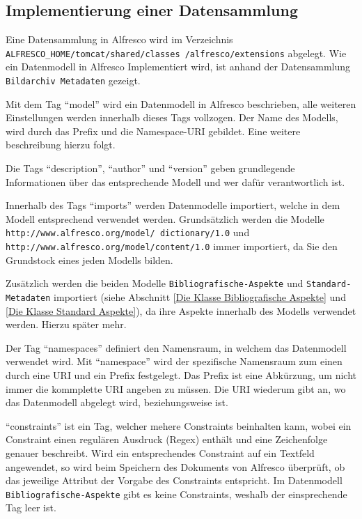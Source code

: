 \FloatBarrier
\subsection{Implementierung einer Datensammlung}
Eine Datensammlung in Alfresco wird im Verzeichnis \texttt{ALFRESCO\_HOME/tomcat/shared/classes
/alfresco/extensions} abgelegt.
Wie ein Datenmodell in Alfresco Implementiert wird, ist anhand der Datensammlung \texttt{Bildarchiv Metadaten} gezeigt.

Mit dem Tag "`model"' wird ein Datenmodell in Alfresco beschrieben, alle weiteren Einstellungen werden innerhalb dieses Tags vollzogen. Der Name des Modells, wird durch das Prefix und die Namespace-URI gebildet. Eine weitere beschreibung hierzu folgt.

Die Tags "`description"', "`author"' und "`version"' geben grundlegende Informationen \"uber das entsprechende Modell und wer daf\"ur verantwortlich ist.

Innerhalb des Tags "`imports"' werden Datenmodelle importiert, welche in dem Modell entsprechend verwendet werden. Grunds\"atzlich werden die Modelle \texttt{http://www.alfresco.org/model/ dictionary/1.0} und \texttt{http://www.alfresco.org/model/content/1.0} immer importiert, da Sie den Grundstock eines jeden Modells bilden.

Zus\"atzlich werden die beiden Modelle \texttt{Bibliografische-Aspekte} und \texttt{Standard-Metadaten} importiert (siehe Abschnitt \ref{Die Klasse Bibliografische Aspekte} und \ref{Die Klasse Standard Aspekte}), da ihre Aspekte innerhalb des Modells verwendet werden. Hierzu sp\"ater mehr.

Der Tag "`namespaces"' definiert den Namensraum, in welchem das Datenmodell verwendet wird. Mit "`namespace"' wird der spezifische Namensraum zum einen durch eine URI und ein Prefix festgelegt. Das Prefix ist eine Abk\"urzung, um nicht immer die kommplette URI angeben zu m\"ussen. Die URI wiederum gibt an, wo das Datenmodell abgelegt wird, beziehungsweise ist.

"`constraints"' ist ein Tag, welcher mehere Constraints beinhalten kann, wobei ein Constraint einen regul\"aren Ausdruck (Regex) enth\"alt und eine Zeichenfolge genauer beschreibt. Wird ein entsprechendes Constraint auf ein Textfeld angewendet, so wird beim Speichern des Dokuments von Alfresco \"uberpr\"uft, ob das jeweilige Attribut der Vorgabe des Constraints entspricht. Im Datenmodell \texttt{Bibliografische-Aspekte} gibt es keine Constraints, weshalb der einsprechende Tag leer ist.

